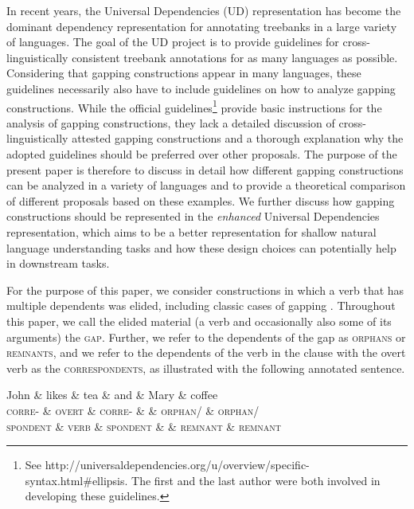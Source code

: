 \documentclass[11pt]{article}
\newenvironment{myquote}%
  {\list{}{\leftmargin=0.0in\rightmargin=0.0in}\item[]}%
  {\endlist}
\begin{document}
In recent years, the Universal Dependencies (UD) representation \cite{Nivre2016} 
has become the dominant dependency representation for annotating treebanks in 
 a large variety of languages. The goal of the UD project is to provide guidelines for 
cross-linguistically consistent treebank annotations for as many languages as 
possible. Considering that gapping constructions appear in many languages, 
these guidelines necessarily also have to include guidelines on how to analyze 
gapping constructions. While the official guidelines\footnote{See {http://universaldependencies.org/u/overview/specific-syntax.html\#ellipsis}. The first and the last author were both involved in developing these guidelines.} 
provide basic instructions for the 
analysis of gapping constructions, they lack a detailed discussion of 
cross-linguistically attested gapping constructions and a thorough explanation 
why the adopted guidelines should be preferred over other proposals. The purpose 
of the present paper is therefore to discuss in detail how different gapping 
constructions can be analyzed in a variety of languages and to provide a theoretical 
comparison of different proposals based on these examples. We further discuss 
how gapping constructions should be represented in the \textit{enhanced} Universal 
Dependencies representation, which aims to be a better representation for shallow 
natural language understanding tasks and how these design choices can potentially 
help in downstream tasks.

For the purpose of this paper, we consider constructions in which 
a verb that has multiple dependents was elided, including classic cases of gapping 
\cite{Ross1970}.
Throughout this paper, we call the elided material 
(a verb and occasionally also some of its arguments) the \textsc{gap}. Further, we refer 
to the dependents of the gap as \textsc{orphans} or \textsc{remnants}, and we refer to 
the dependents of the verb in the clause with the overt verb as the 
\textsc{correspondents}, as illustrated with the following annotated sentence.

\begin{myquote}
  \footnotesize
  \begin{dependency}
    \begin{deptext}[column sep=-0.02cm]
      John \& likes \& tea \& and \& Mary \& coffee \\
      \textsc{corre-} \& \textsc{overt} \& \textsc{corre-} \& \& \textsc{orphan}/ \& \textsc{orphan}/ \\
      \textsc{spondent} \& \textsc{verb} \& \textsc{spondent}  \& \& \textsc{remnant} \& \textsc{remnant}  \\
    \end{deptext}
  \end{dependency}
\end{myquote}
\end{document}
